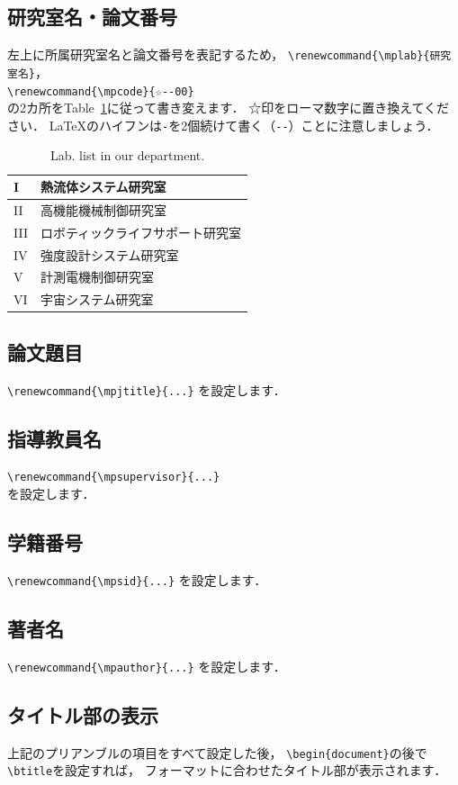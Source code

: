 \documentclass[twocolumn]{jsarticle}
\renewcommand{\mplab}{高機能機械制御研究室}
\renewcommand{\mpcode}{☆--10}
\renewcommand{\mpjtitle}{
  卒業論文概要原稿用\LaTeXe テンプレート
}
\renewcommand{\mpsupervisor}{○○~○○~教授}
\renewcommand{\mpsid}{0123456}
\renewcommand{\mpauthor}{△△~△△}
\begin{document}
\subsection{研究室名・論文番号}
左上に所属研究室名と論文番号を表記するため，
\verb+\renewcommand{\mplab}{研究室名}+，\\
\verb+\renewcommand{\mpcode}{☆--00}+ \\
の2カ所をTable~\ref{table:lablist}に従って書き変えます．
☆印をローマ数字に置き換えてください．
\LaTeX のハイフンは\verb+-+を2個続けて書く（\verb+--+）ことに注意しましょう．
%
\begin{table}[ht]
  \centering
  \caption{Lab. list in our department.}
  \label{table:lablist}
  \begin{tabular}{|l|l|}\hline
    I & 熱流体システム研究室 \\ \hline 
    II & 高機能機械制御研究室 \\ \hline
    III & ロボティックライフサポート研究室 \\ \hline 
    IV & 強度設計システム研究室 \\ \hline
    V & 計測電機制御研究室 \\ \hline
    VI & 宇宙システム研究室 \\ \hline
  \end{tabular}
\end{table}

\subsection{論文題目}
\verb+\renewcommand{\mpjtitle}{...}+
を設定します．

\subsection{指導教員名}
\verb+\renewcommand{\mpsupervisor}{...}+ \\
を設定します．

\subsection{学籍番号}
\verb+\renewcommand{\mpsid}{...}+
を設定します．

\subsection{著者名}
\verb+\renewcommand{\mpauthor}{...}+
を設定します．

\subsection{タイトル部の表示}
上記のプリアンブルの項目をすべて設定した後，
\verb+\begin{document}+の後で\verb+\btitle+を設定すれば，
フォーマットに合わせたタイトル部が表示されます．
\end{document}
